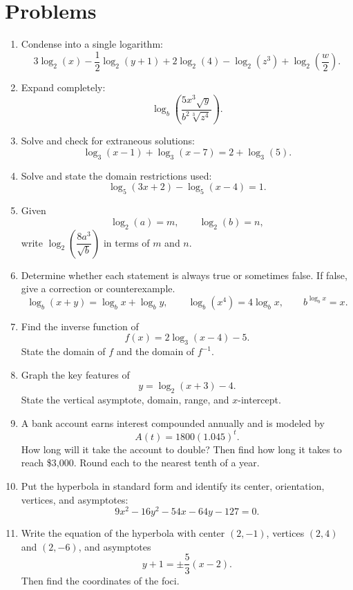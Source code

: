 \documentclass[12pt]{article}
\begin{document}
\section*{Problems}
\begin{enumerate}[leftmargin=*, itemsep=1em, topsep=0.8em]
  \item Condense into a single logarithm:
  \[
  3\log_2(x)-\frac12\log_2(y+1)+2\log_2(4)-\log_2(z^3)+\log_2\!\left(\frac{w}{2}\right).
  \]

  \item Expand completely:
  \[
  \log_b\!\left(\frac{5x^3\sqrt{y}}{b^2\sqrt[3]{z^4}}\right).
  \]

  \item Solve and check for extraneous solutions:
  \[
  \log_3(x-1)+\log_3(x-7)=2+\log_3(5).
  \]

  \item Solve and state the domain restrictions used:
  \[
  \log_5(3x+2)-\log_5(x-4)=1.
  \]

  \item Given
  \[
  \log_2(a)=m,\qquad \log_2(b)=n,
  \]
  write $\log_2\!\left(\dfrac{8a^3}{\sqrt{b}}\right)$ in terms of $m$ and $n$.

  \item Determine whether each statement is always true or sometimes false. If false, give a correction or counterexample.
  \[
  \log_b(x+y)=\log_bx+\log_by,\qquad
  \log_b(x^4)=4\log_bx,\qquad
  b^{\log_b x}=x.
  \]

  \item Find the inverse function of
  \[
  f(x)=2\log_3(x-4)-5.
  \]
  State the domain of $f$ and the domain of $f^{-1}$.

  \item Graph the key features of
  \[
  y=\log_2(x+3)-4.
  \]
  State the vertical asymptote, domain, range, and $x$-intercept.

  \item A bank account earns interest compounded annually and is modeled by
  \[
  A(t)=1800(1.045)^t.
  \]
  How long will it take the account to double? Then find how long it takes to reach \$3,000. Round each to the nearest tenth of a year.

  \item Put the hyperbola in standard form and identify its center, orientation, vertices, and asymptotes:
  \[
  9x^2-16y^2-54x-64y-127=0.
  \]

  \item Write the equation of the hyperbola with center $(2,-1)$, vertices $(2,4)$ and $(2,-6)$, and asymptotes
  \[
  y+1=\pm \frac{5}{3}(x-2).
  \]
  Then find the coordinates of the foci.


\end{enumerate}
\end{document}
